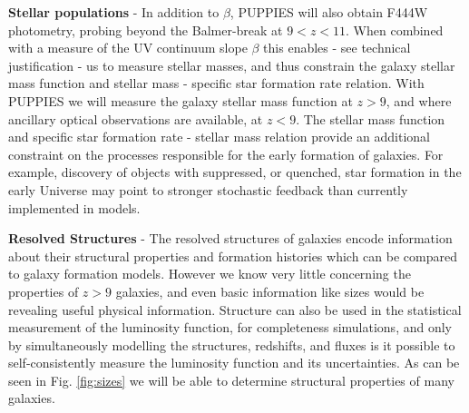 \documentclass[12pt]{article}
\begin{document}
\vspace{2mm}
\noindent
\textbf{Stellar populations} - In addition to $\beta$, PUPPIES will also obtain F444W photometry, probing beyond the Balmer-break at $9<z<11$. When combined with a measure of the UV continuum slope $\beta$ this enables - see technical justification - us to measure stellar masses, and thus constrain the galaxy stellar mass function and stellar mass - specific star formation rate relation. With PUPPIES we will measure the galaxy stellar mass function at $z>9$, and where ancillary optical observations are available, at $z<9$. The stellar mass function and specific star formation rate - stellar mass relation provide an additional constraint on the processes responsible for the early formation of galaxies. For example, discovery of objects with suppressed, or quenched, star formation in the early Universe may point to stronger stochastic feedback than currently implemented in models.  

\vspace{2mm}
\noindent
\textbf{Resolved Structures} - The resolved structures of galaxies encode information about their structural properties and formation histories which can be compared to galaxy formation models.  However we know very little concerning the properties of $z > 9$ galaxies, and even basic information like sizes would be revealing  useful physical information.     Structure can also be used in the statistical measurement of the luminosity function, for completeness simulations, and only by simultaneously modelling the structures, redshifts, and fluxes is it possible to self-consistently measure the luminosity function and its uncertainties.   As can be seen in Fig. \ref{fig:sizes} we will be able to determine structural properties of many galaxies.
\end{document}
